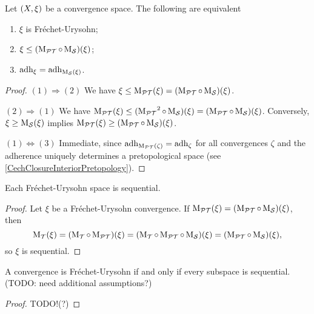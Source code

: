\begin{lemma} \label{FrechetUrysohnLemma}
Let $\left( X,\xi \right)$ be a convergence space. The following are equivalent
\begin{enumerate}
\item $\xi$ is Fréchet-Urysohn;
\item $\xi \leq (\operatorname{M_\mathcal{PT}}\circ \operatorname{M_\mathcal{S}})(\xi)$;
\item $\operatorname{adh}_\xi = \operatorname{adh}_{\operatorname{M_\mathcal{S}}(\xi)}$.
\end{enumerate}
\end{lemma}
\begin{proof}
$(1) \Rightarrow (2)$ We have $\xi\leq \operatorname{M_\mathcal{PT}}(\xi) = (\operatorname{M_\mathcal{PT}}\circ \operatorname{M_\mathcal{S}})(\xi)$.

$(2) \Rightarrow (1)$ We have $\operatorname{M_\mathcal{PT}}(\xi) \leq (\operatorname{M_\mathcal{PT}}^2\circ \operatorname{M_\mathcal{S}})(\xi) = (\operatorname{M_\mathcal{PT}}\circ \operatorname{M_\mathcal{S}})(\xi)$. Conversely, $\xi \geq \operatorname{M_\mathcal{S}}(\xi)$ implies $\operatorname{M_\mathcal{PT}}(\xi) \geq (\operatorname{M_\mathcal{PT}}\circ \operatorname{M_\mathcal{S}})(\xi)$.

$(1) \Leftrightarrow (3)$ Immediate, since $\operatorname{adh}_{\operatorname{M_\mathcal{PT}}(\zeta)} = \operatorname{adh}_\zeta$ for all convergences $\zeta$ and the adherence uniquely determines a pretopological space (see \ref{CechClosureInteriorPretopology}). 
\end{proof}

\begin{lemma}
Each Fréchet-Urysohn space is sequential.
\end{lemma}
\begin{proof}
Let $\xi$ be a Fréchet-Urysohn convergence. If $\operatorname{M_\mathcal{PT}}(\xi) = (\operatorname{M_\mathcal{PT}}\circ \operatorname{M_\mathcal{S}})(\xi)$, then
\[ \operatorname{M_\mathcal{T}}(\xi) = (\operatorname{M_\mathcal{T}}\circ\operatorname{M_\mathcal{PT}})(\xi) = (\operatorname{M_\mathcal{T}}\circ\operatorname{M_\mathcal{PT}}\circ \operatorname{M_\mathcal{S}})(\xi) = (\operatorname{M_\mathcal{PT}}\circ \operatorname{M_\mathcal{S}})(\xi), \]
so $\xi$ is sequential.
\end{proof}

\begin{proposition}
A convergence is Fréchet-Urysohn \textup{if and only if} every subspace is sequential. (TODO: need additional assumptions?)
\end{proposition}
\begin{proof}
TODO!(?)
\end{proof}

